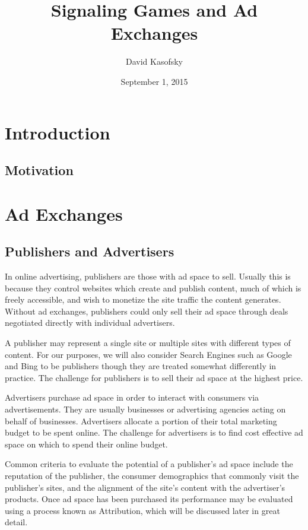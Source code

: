 \documentclass{article}
\title{Signaling Games and Ad Exchanges}
\author{David Kasofsky}
\date{September 1, 2015}
\begin{document}
\maketitle

\newpage

\tableofcontents

\newpage

\section{Introduction}

\subsection{Motivation}

\newpage

\section{Ad Exchanges}

\subsection{Publishers and Advertisers}

In online advertising, publishers are those with ad space to sell. Usually this is because they control websites which create and publish content, much of which is freely accessible, and wish to monetize the site traffic the content generates. Without ad exchanges, publishers could only sell their ad space through deals negotiated directly with individual advertisers. 

A publisher may represent a single site or multiple sites with different types of content. For our purposes, we will also consider Search Engines such as Google and Bing to be publishers though they are treated somewhat differently in practice. The challenge for publishers is to sell their ad space at the highest price.

Advertisers purchase ad space in order to interact with consumers via advertisements. They are usually businesses or advertising agencies acting on behalf of businesses. Advertisers allocate a portion of their total marketing budget to be spent online. The challenge for advertisers is to find cost effective ad space on which to spend their online budget. 

Common criteria to evaluate the potential of a publisher's ad space include the reputation of the publisher, the consumer demographics that commonly visit the publisher's sites, and the alignment of the site's content with the advertiser's products. Once ad space has been purchased its performance may be evaluated using a process known as Attribution, which will be discussed later in great detail.
\end{document}
